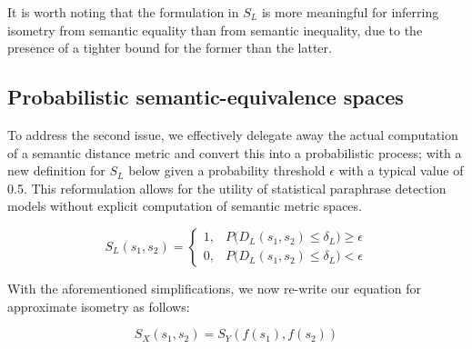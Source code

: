 \documentclass[11pt,a4paper]{article}
\begin{document}
It is worth noting that the formulation in $S_L$ is more meaningful for inferring isometry from semantic equality than from semantic inequality, due to the presence of a tighter bound for the former than the latter.

\subsection{Probabilistic semantic-equivalence spaces}

To address the second issue, we effectively delegate away the actual computation of a semantic distance metric and convert this into a probabilistic process; with a new definition for $S_L$ below given a probability threshold $\epsilon$ with a typical value of 0.5. This reformulation allows for the utility of statistical paraphrase detection models without explicit computation of semantic metric spaces. 

\begin{equation}
  \label{bounded_isometry_probability_eqn}
  S_L(s_1,s_2) =
  \begin{cases}
    1, &P\big(D_L(s_1,s_2) \leq \delta_L\big) \geq \epsilon \\
    0, &P\big(D_L(s_1,s_2) \leq \delta_L\big) < \epsilon
  \end{cases}
\end{equation}

With the aforementioned simplifications, we now re-write our equation for approximate isometry as follows:

\begin{equation}  
  \label{exact_approx_isometry_eqn}
  S_X(s_1,s_2) = S_Y(f(s_1),f(s_2))
\end{equation}

\end{document}
